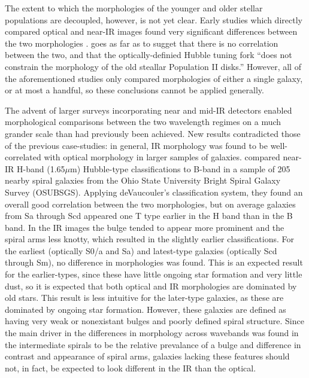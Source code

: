 The extent to which the morphologies of the younger and older stellar populations are decoupled, however, is not yet clear. Early studies which directly compared optical and near-IR images found very significant differences between the two morphologies \citep{Hackwell1983,Thronson1989,Block1991,Block1994}. \citet{Block1999} goes as far as to sugget that there is no correlation between the two, and that the optically-definied Hubble tuning fork ``does not constrain the morphology of the old steallar Population II disks.'' However, all of the aforementioned studies only compared morphologies of either a single galaxy, or at most a handful, so these conclusions cannot be applied generally.

The advent of larger surveys incorporating near and mid-IR detectors enabled morphological comparisons between the two wavelength regimes on a much grander scale than had previously been achieved. New results contradicted those of the previous case-studies: in general, IR morphology was found to be well-correlated with optical morphology in larger samples of galaxies. \citet{Eskridge2002} compared near-IR H-band (1.65$\mu$m) Hubble-type classifications to B-band in a sample of 205 nearby spiral galaxies from the Ohio State University Bright Spiral Galaxy Survey (OSUBSGS). Applying deVaucouler's classification system, they found an overall good correlation between the two morphologies, but on average galaxies from Sa through Scd appeared one T type earlier in the H band than in the B band. In the IR images the bulge tended to appear more prominent and the spiral arms less knotty, which resulted in the slightly earlier classifications. For the earliest (optically S0/a and Sa) and latest-type galaxies (optically Scd through Sm), no difference in morphologies was found. This is an expected result for the earlier-types, since these have little ongoing star formation and very little dust, so it is expected that both optical and IR morphologies are dominated by old stars. This result is less intuitive for the later-type galaxies, as these are dominated by ongoing star formation. However, these galaxies are defined as having very weak or nonexistant bulges and poorly defined spiral structure. Since the main driver in the differences in morphology across wavebands was found in the intermediate spirals to be the relative prevalance of a bulge and difference in contrast and appearance of spiral arms, galaxies lacking these features should not, in fact, be expected to look different in the IR than the optical. 
 
